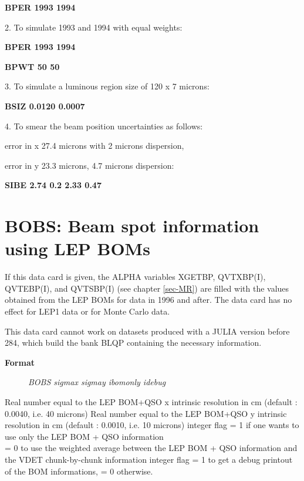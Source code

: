 {\bf BPER 1993 1994}
\par
 
2. To simulate 1993 and 1994 with equal weights:\
 
{\bf BPER 1993 1994}
 
{\bf BPWT   50   50}
\par
3. To simulate a luminous region size of 120 x 7 microns:
 
{\bf BSIZ 0.0120 0.0007 }
\par 
4. To smear the beam position uncertainties as follows: 

 error in x 27.4 microns with 2 microns dispersion,  

 error in y 23.3 microns, 4.7 microns dispersion:

{\bf SIBE 2.74 0.2 2.33 0.47}
         


\section{\label{sec-DCBOBS}BOBS: Beam spot information using LEP BOMs}
\par

If this data card is given, the  ALPHA variables XGETBP, QVTXBP(I), QVTEBP(I), and QVTSBP(I) (see chapter \ref{sec-MR})
are filled with the values obtained from the LEP BOMs for data in 1996 and after. The data card has no effect for LEP1 data
or for Monte Carlo data.

This data card cannot work on datasets produced with a JULIA version before 284, which build the bank BLQP containing the
necessary information. 

\par
\begin{description}\item[\bf{Format}]
{\it BOBS sigmax  sigmay  ibomonly idebug}
\end{description}

\begin{indentlist}{ 3.75cm}{ 4.00cm}
Real number equal to the LEP BOM+QSO x intrinsic resolution in cm (default : 0.0040, i.e. 40 microns)
Real number equal to the LEP BOM+QSO y intrinsic resolution in cm (default : 0.0010, i.e. 10 microns)
integer flag  = 1 if one wants to use only the LEP BOM + QSO information\\
              = 0 to use the weighted average between the LEP BOM + QSO information and the VDET chunk-by-chunk information
integer flag = 1 to get a debug printout of the BOM informations, = 0 otherwise.
\end{indentlist}

